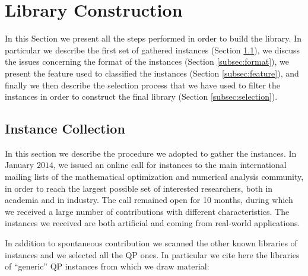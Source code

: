 \section{Library Construction}\label{sec:lib}

In this Section we present all the steps performed in order to build the library. In particular we describe the first set of gathered instances (Section \ref{subsec:instColl}), we discuss the issues concerning the format of the instances (Section \ref{subsec:format}), we present the feature used to classified the instances (Section \ref{subsec:feature}), and finally we then describe the selection process that we have used to filter the instances in order to construct the final library (Section \ref{subsec:selection}).

\subsection{Instance Collection}\label{subsec:instColl}

In this section we describe the procedure we adopted to gather the instances. In January $2014$, we issued an online call for instances to the main international mailing lists of the mathematical optimization and numerical analysis community, in order to reach the largest possible set of interested researchers, both in academia and in industry. The call remained open for 10 months, during which we received a large number of contributions with different characteristics. The instances we received  are both artificial and coming from real-world applications.

In addition to spontaneous contribution we scanned the other known libraries of instances and we selected all the QP ones. In particular we cite here the libraries of ``generic'' QP instances from which we draw material:

